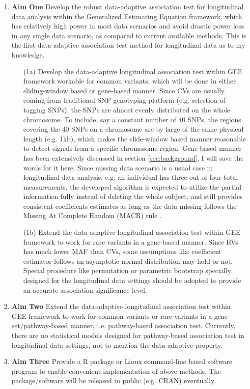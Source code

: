 \documentclass[12pt]{article}
\begin{document}
\begin{enumerate}
\item \textbf{Aim One}
Develop the robust data-adaptive association test for longitudinal data analysis within the Generalized Estimating Equation framework, which has relatively high power in most data scenarios and avoid drastic power loss in any single data scenario, as compared to current available methods. This is the first data-adaptive association test method for longitudinal data as to my knowledge.

\begin{enumerate}
\item[(1a)]
Develop the data-adaptive longitudinal association test within GEE framework workable for common variants, which will be done in either sliding-window based or gene-based manner. Since CVs are usually coming from traditional SNP genotyping platform (e.g. selection of tagging SNPs), the SNPs are almost evenly distributed on the whole chromosome. To include, say a constant number of 40 SNPs, the regions covering the 40 SNPs on a chromosome are by large of the same physical length (e.g. 1kb), which makes the slide-window based manner reasonable to detect signals from a specific chromosome region. Gene-based manner has been extensively discussed in section \ref{sec:background}, I will save the words for it here. Since missing data scenario is a usual case in longitudinal data analysis, e.g. an individual has three out of four total measurements, the developed algorithm is expected to utilize the partial information fully instead of deleting the whole subject, and still provides consistent coefficients estimates as long as the data missing follows the Missing At Complete Random (MACR) rule \cite{rubin1976inference,Xu2014}.
\item[(1b)]
Extend the data-adaptive longitudinal association test within GEE framework to work for rare variants in a gene-based manner. Since RVs has much lower MAF than CVs, some assumptions like coefficient estimator follows an asymptotic normal distribution may hold or not. Special procedure like permutation or parametric bootstrap specially designed for the longitudinal data settings should be adopted to provide an accurate association significance level.
\end{enumerate}

\item \textbf{Aim Two}
Extend the data-adaptive longitudinal association test within GEE framework to work for common variants or rare variants in a gene-set/pathway-based manner, i.e. pathway-based association test. Currently, there are no statistical models designed for pathway-based association test in longitudinal data settings, not to mention the data-adaptive property.

\item \textbf{Aim Three}
Provide a R package or Linux command-line based software program to enable convenient implementation of above methods. The package/software will be released to public (e.g. CRAN) eventually.
\end{enumerate}
\end{document}
